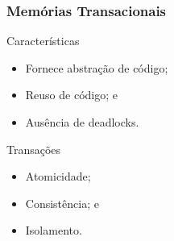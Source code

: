 \documentclass[10pt, pdf,xcolor=pdftex,dvipsnames,table]{beamer}
\begin{document}
\begin{frame} \frametitle{Memórias Transacionais}
    \begin{block}{Características}
        \begin{itemize}
        	\item Fornece abstração de código;
        	\item Reuso de código; e
        	\item Ausência de deadlocks.
        \end{itemize}
    \end{block}
    
    \begin{block}{Transações}
        \begin{itemize}
        	\item Atomicidade;
        	\item Consistência; e
        	\item Isolamento.
        \end{itemize}
    \end{block}
\end{frame}

\end{document}
